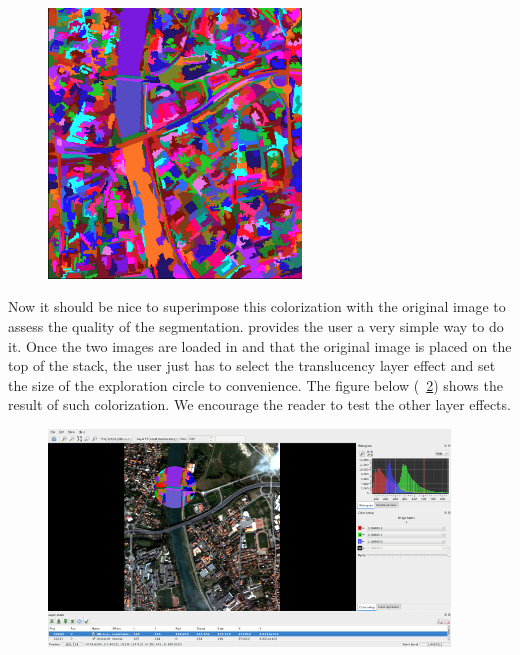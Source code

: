 \begin{figure}[!h] 
  \center
  \includegraphics[width=0.6\textwidth]{../Art/MonteverdiImages/seg3.png}
  \label{fig:seg3}
\end{figure}

Now it should be nice to superimpose this colorization with the original image to assess the quality of the segmentation.
\mont provides the user a very simple way to do it. Once the two images are loaded in \mont and that the original image is placed on the top of the stack, 
the user just has to select the translucency layer effect and set the size of the exploration circle to convenience.
The figure below (~\ref{fig:seg4}) shows the result of such colorization. We encourage the reader to test the other layer effects.

\begin{figure}[!h] 
  \center
  \includegraphics[width=0.95\textwidth]{../Art/MonteverdiImages/seg4.png}
  \label{fig:seg4}
\end{figure}


